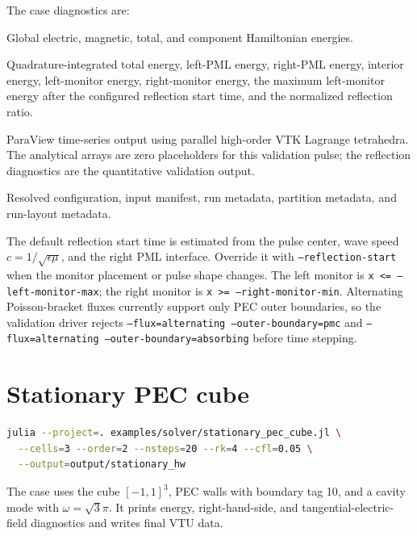 \documentclass[11pt,oneside]{book}
\newcommand{\code}[1]{\texttt{#1}}
\begin{document}
The case diagnostics are:
\begin{description}[style=nextline]
  \item[\code{diagnostics/energy.csv}]
  Global electric, magnetic, total, and component Hamiltonian energies.

  \item[\code{diagnostics/reflection\_diagnostics.csv}]
  Quadrature-integrated total energy, left-PML energy, right-PML energy,
  interior energy, left-monitor energy, right-monitor energy, the maximum
  left-monitor energy after the configured reflection start time, and the
  normalized reflection ratio.

  \item[\code{fields.pvd} and \code{fields/}]
  ParaView time-series output using parallel high-order VTK Lagrange
  tetrahedra. The analytical arrays are zero placeholders for this validation
  pulse; the reflection diagnostics are the quantitative validation output.

  \item[\code{config/} and \code{input/}]
  Resolved configuration, input manifest, run metadata, partition metadata,
  and run-layout metadata.
\end{description}

The default reflection start time is estimated from the pulse center, wave
speed $c=1/\sqrt{\epsilon\mu}$, and the right PML interface. Override it with
\code{--reflection-start} when the monitor placement or pulse shape changes.
The left monitor is \code{x <= --left-monitor-max}; the right monitor is
\code{x >= --right-monitor-min}. Alternating Poisson-bracket fluxes currently
support only PEC outer boundaries, so the validation driver rejects
\code{--flux=alternating --outer-boundary=pmc} and
\code{--flux=alternating --outer-boundary=absorbing} before time stepping.

\section{Stationary PEC cube}

\begin{lstlisting}[language=bash]
julia --project=. examples/solver/stationary_pec_cube.jl \
  --cells=3 --order=2 --nsteps=20 --rk=4 --cfl=0.05 \
  --output=output/stationary_hw
\end{lstlisting}

The case uses the cube $[-1,1]^3$, PEC walls with boundary tag 10, and a
cavity mode with $\omega=\sqrt{3}\pi$. It prints energy, right-hand-side, and
tangential-electric-field diagnostics and writes final VTU data.
\end{document}
